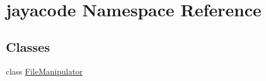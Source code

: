 \hypertarget{namespacejayacode}{}\section{jayacode Namespace Reference}
\label{namespacejayacode}
\subsection*{Classes}
\begin{DoxyCompactItemize}
\item 
class \hyperlink{classjayacode_1_1_file_manipulator}{File\+Manipulator}
\end{DoxyCompactItemize}
